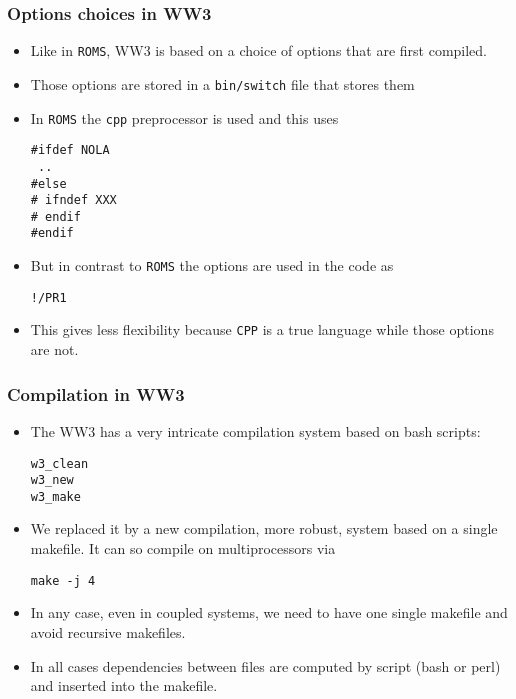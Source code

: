 \documentclass{beamer}
\begin{document}
\begin{frame}[fragile]
  \frametitle{Options choices in WW3}
\begin{itemize}
\item Like in {\tt ROMS}, WW3 is based on a choice of options that are first compiled.
\item Those options are stored in a  {\tt bin/switch} file that stores them
\item In {\tt ROMS} the {\tt cpp} preprocessor is used and this uses
\begin{verbatim}
#ifdef NOLA
 ..
#else
# ifndef XXX
# endif
#endif
\end{verbatim}
\item But in contrast to {\tt ROMS} the options are used in the code as
\begin{verbatim}
!/PR1     
\end{verbatim}
\item This gives less flexibility because {\tt CPP} is a true language while those options are not.

\end{itemize}
\end{frame}




\begin{frame}[fragile]
  \frametitle{Compilation in WW3}
\begin{itemize}
\item The WW3 has a very intricate compilation system based on bash scripts:
\begin{verbatim}
w3_clean
w3_new
w3_make
\end{verbatim}
\item We replaced it by a new compilation, more robust, system based on a single makefile. It can so compile on multiprocessors via
\begin{verbatim}
make -j 4
\end{verbatim}
\item In any case, even in coupled systems, we need to have one single makefile and avoid recursive makefiles.
\item In all cases dependencies between files are computed by script (bash or perl) and inserted into the makefile.
\end{itemize}
\end{frame}
\end{document}
